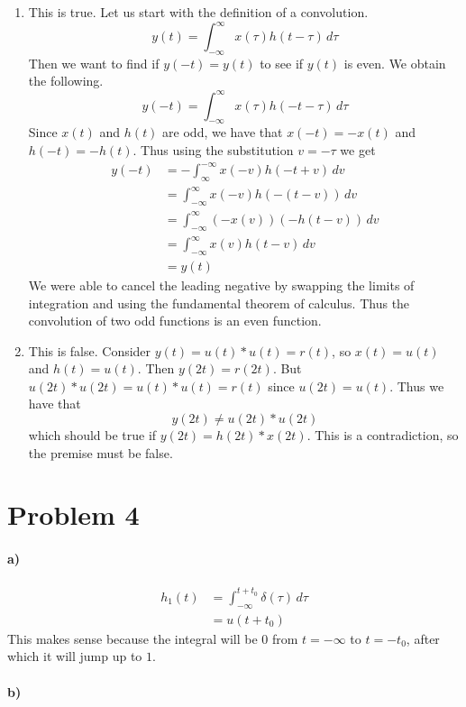 \documentclass[12pt]{article}
\begin{document}
\begin{enumerate}
    \item This is true. Let us start with the definition of a convolution.
    \[y(t)=\int_{-\infty}^\infty x(\tau)h(t-\tau)\, d\tau\]
    Then we want to find if \(y(-t)=y(t)\) to see if \(y(t)\) is even. We obtain the following.
    \[y(-t)=\int_{-\infty}^\infty x(\tau)h(-t-\tau)\, d\tau\]
    Since \(x(t)\) and \(h(t)\) are odd, we have that \(x(-t)=-x(t)\) and \(h(-t)=-h(t)\). Thus using the substitution \(v=-\tau\) we get
    \begin{align*}
        y(-t)&=-\int_\infty^{-\infty} x(-v)h(-t+v)\, dv\\
        &=\int_{-\infty}^\infty x(-v)h(-(t-v))\, dv\\
        &=\int_{-\infty}^\infty (-x(v))(-h(t-v))\, dv\\
        &=\int_{-\infty}^\infty x(v)h(t-v)\, dv\\
        &=y(t)
    \end{align*}
    We were able to cancel the leading negative by swapping the limits of integration and using the fundamental theorem of calculus. Thus the convolution
    of two odd functions is an even function.
    \item This is false. Consider \(y(t)=u(t)*u(t)=r(t)\), so \(x(t)=u(t)\) and \(h(t)=u(t)\). Then \(y(2t)=r(2t)\). But \(u(2t)*u(2t)=u(t)*u(t)=r(t)\) since \(u(2t)=u(t)\). Thus we have that
    \[y(2t)\neq u(2t)*u(2t)\]
    which should be true if \(y(2t)=h(2t)*x(2t)\). This is a contradiction, so the premise must be false.
\end{enumerate}

\section*{Problem 4}

\paragraph{a)}

\begin{align*}
    h_1(t)&=\int_{-\infty}^{t+t_0} \delta(\tau)\, d\tau\\
    &=u(t+t_0)
\end{align*}
This makes sense because the integral will be \(0\) from \(t=-\infty\) to \(t=-t_0\), after which it will jump up to \(1\).

\paragraph{b)}
\end{document}

